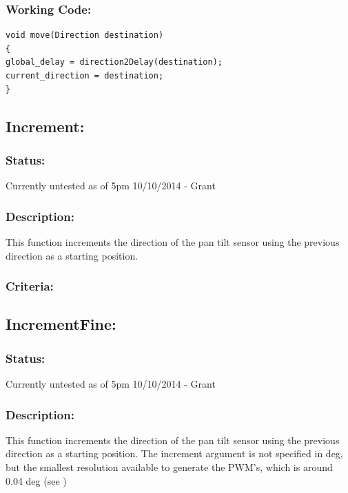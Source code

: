 \documentclass[]{report}
\begin{document}
\subsubsection{Working Code:}
\begin{lstlisting}
void move(Direction destination)
{
global_delay = direction2Delay(destination);
current_direction = destination;
}
\end{lstlisting}

\subsection{Increment:}
\subsubsection{Status:}
Currently untested as of 5pm 10/10/2014 - Grant

\subsubsection{Description:}
This function increments the direction of the pan tilt sensor using the previous direction as a starting position.

\subsubsection{Criteria:}

\subsection{IncrementFine:}
\subsubsection{Status:}
Currently untested as of 5pm 10/10/2014 - Grant

\subsubsection{Description:}
This function increments the direction of the pan tilt sensor using the previous direction as a starting position. The increment argument is not specified in deg, but the smallest resolution available to generate the PWM's, which is around 0.04 deg (see )

\newpage
\end{document}
